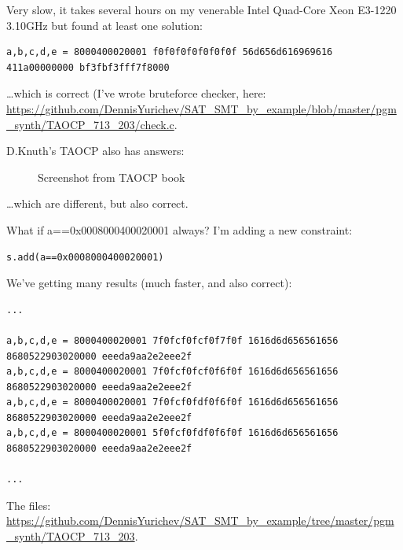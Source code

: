 

Very slow, it takes several hours on my venerable Intel Quad-Core Xeon E3-1220 3.10GHz but found at least one solution:

\begin{lstlisting}
a,b,c,d,e = 8000400020001 f0f0f0f0f0f0f0f 56d656d616969616 411a00000000 bf3fbf3fff7f8000
\end{lstlisting}

\dots which is correct (I've wrote bruteforce checker, here: \url{https://github.com/DennisYurichev/SAT_SMT_by_example/blob/master/pgm_synth/TAOCP_713_203/check.c}.

D.Knuth's TAOCP also has answers:

\begin{figure}[H]
\centering
{}
\caption{Screenshot from TAOCP book}
\end{figure}

\dots which are different, but also correct.

What if a==0x0008000400020001 always?
I'm adding a new constraint:

\begin{lstlisting}
s.add(a==0x0008000400020001)
\end{lstlisting}

We've getting many results (much faster, and also correct):

\begin{lstlisting}
...

a,b,c,d,e = 8000400020001 7f0fcf0fcf0f7f0f 1616d6d656561656 8680522903020000 eeeda9aa2e2eee2f
a,b,c,d,e = 8000400020001 7f0fcf0fcf0f6f0f 1616d6d656561656 8680522903020000 eeeda9aa2e2eee2f
a,b,c,d,e = 8000400020001 7f0fcf0fdf0f6f0f 1616d6d656561656 8680522903020000 eeeda9aa2e2eee2f
a,b,c,d,e = 8000400020001 5f0fcf0fdf0f6f0f 1616d6d656561656 8680522903020000 eeeda9aa2e2eee2f

...
\end{lstlisting}

The files: \url{https://github.com/DennisYurichev/SAT_SMT_by_example/tree/master/pgm_synth/TAOCP_713_203}.

